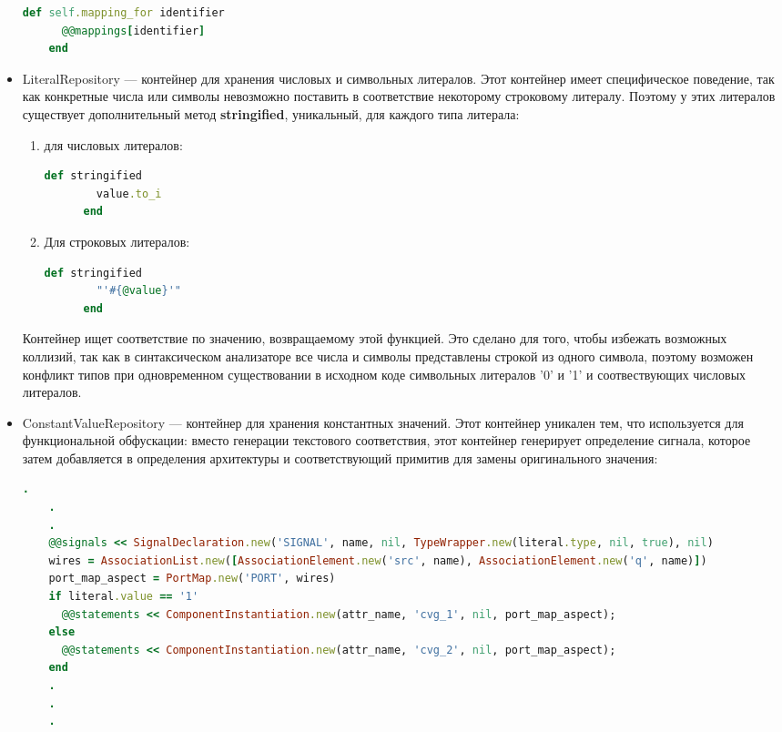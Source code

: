 \begin{itemize}
\begin{lstlisting}[language=Ruby, style=rubystyle,caption={Вспомогательные методы контейнера}, label=lst:arch_and_mod:support_methods]
    def self.mapping_for identifier
      @@mappings[identifier]
    end
  \end{lstlisting}
  \item
  LiteralRepository --- контейнер для хранения числовых и символьных литералов. Этот контейнер имеет специфическое поведение, так как конкретные числа или символы невозможно поставить в соответствие некоторому строковому литералу. Поэтому у этих литералов существует дополнительный метод \textbf{stringified}, уникальный, для каждого типа литерала:
  \begin{enumerate}
  \item для числовых литералов:
    \begin{lstlisting}[language=Ruby, style=rubystyle,caption={Вспомогательные метод stringified для числовых литералов}, label=lst:arch_and_mod:decimal_stringified]
      def stringified
        value.to_i
      end
    \end{lstlisting}
  \item Для строковых литералов:
     \begin{lstlisting}[language=Ruby, style=rubystyle,caption={Вспомогательные метод stringified для символьных литералов}, label=lst:arch_and_mod:character_stringified]
      def stringified
        "'#{@value}'"
      end
    \end{lstlisting}
  \end{enumerate}
  Контейнер ищет соответствие по значению, возвращаемому этой функцией. Это сделано для того, чтобы избежать возможных коллизий, так как в синтаксическом анализаторе все числа и символы представлены строкой из одного символа, поэтому возможен конфликт типов при одновременном существовании в исходном коде символьных литералов '0' и '1' и соотвествующих числовых литералов.
  \item
  ConstantValueRepository --- контейнер для хранения константных значений. Этот контейнер уникален тем, что используется для функциональной обфускации: вместо генерации текстового соответствия, этот контейнер генерирует определение сигнала, которое затем добавляется в определения архитектуры и соответствующий примитив для замены оригинального значения:
  \begin{lstlisting}[language=Ruby, style=rubystyle,caption={Создание сигнала на основе значения константы}, label=lst:arch_and_mod:constant_generate_name]
    .
    .
    .
    @@signals << SignalDeclaration.new('SIGNAL', name, nil, TypeWrapper.new(literal.type, nil, true), nil)
    wires = AssociationList.new([AssociationElement.new('src', name), AssociationElement.new('q', name)])
    port_map_aspect = PortMap.new('PORT', wires)
    if literal.value == '1'
      @@statements << ComponentInstantiation.new(attr_name, 'cvg_1', nil, port_map_aspect);
    else
      @@statements << ComponentInstantiation.new(attr_name, 'cvg_2', nil, port_map_aspect);
    end
    .
    .
    .
  \end{lstlisting}
  \end{itemize}


